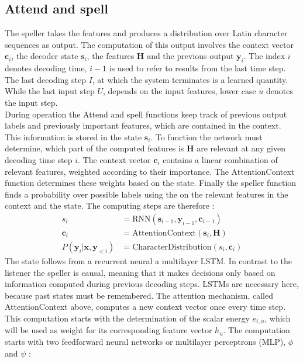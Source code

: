 \subsection{Attend and spell}
\label{subsec:AttendAndSpell}
The speller takes the features and produces a distribution over Latin character sequences as output. The computation of this output involves the context vector $\mathbf{c}_i$, the decoder state $\mathbf{s}_i$, the features $\mathbf{H}$ and the previous output $\mathbf{y}_i$. The index $i$ denotes decoding time, $i-1$ is used to refer to results from the last time step. The last decoding step $I$, at which the system terminates is a learned quantity. While the last input step $U$, depends on the input features, lower case $u$ denotes the input step.\\
During operation the Attend and spell functions keep track of previous output labels and previously important features, which are contained in the context. This information is stored in the state $\mathbf{s}_i$. To function the network must determine, which part of the computed features is $\mathbf{H}$ are relevant at any given decoding time step $i$. The context vector $\mathbf{c}_i$ contains a linear combination of relevant features, weighted according to their importance. The AttentionContext function determines these weights based on the state. Finally the speller function finds a probability over possible labels using the on the relevant features in the context and the state. The computing steps are therefore \cite[page 4]{Chan2015}:
\begin{align}
 s_i &= \text{RNN}(\mathbf{s}_{i-1}, \mathbf{y}_{i-1}, \mathbf{c}_{i-1}) \\
 \mathbf{c}_i &= \text{AttentionContext}(\mathbf{s}_i,\mathbf{H}) \\
  P(\mathbf{y}_i|\mathbf{x}, \mathbf{y}_{<i}) &= \text{CharacterDistribution}(s_i,\textbf{c}_i)
\end{align}
The state follows from a recurrent neural a multilayer LSTM. In contrast to the listener the speller is causal, meaning that it makes decisions only based on information computed during previous decoding steps. LSTMs are necessary here, because past states must be remembered. The attention mechanism, called AttentionContext above, computes a new context vector once every time step.
This computation starts with the determination of the scalar energy $e_{i,u}$, which will be used as weight for its corresponding feature vector  $h_u$. The computation starts with two feedforward neural networks or multilayer perceptrons (MLP), $\phi$ and $\psi$ \cite[page 5]{Chan2015}:
